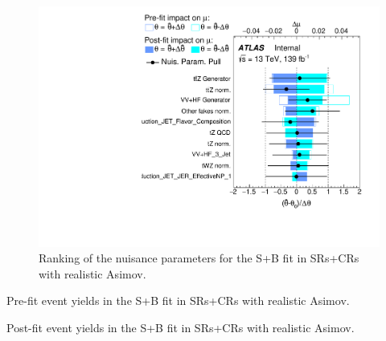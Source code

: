 \begin{figure}[htbp]
	\centering
	\includegraphics[width=.9\textwidth]{Chapters/CH8/figures/SPLUSB_CRSR_UsingDL1rcFullSys/Ranking}
	\caption{Ranking of the nuisance parameters for the S+B \tZc fit in SRs+CRs with realistic Asimov.}%
	\label{fig:stat:tzc:splusb:crsr:ranking}
\end{figure}

\FloatBarrier
\clearpage
\begin{table}[]
	\centering
	\tiny
	
	\caption{Pre-fit event yields in the S+B \tZc fit in SRs+CRs with realistic Asimov. \TabErrStatSys} 
	\label{tab:stat:tzc:splusb:crsr:yields:prefit}
\end{table} 

\begin{table}[]
	\centering
	\tiny
	
	\caption{Post-fit event yields in the S+B \tZc fit in SRs+CRs with realistic Asimov. \TabErrStatSys} 
	\label{tab:stat:tzc:splusb:crsr:yields:postfit}
\end{table} 
\clearpage
\FloatBarrier

